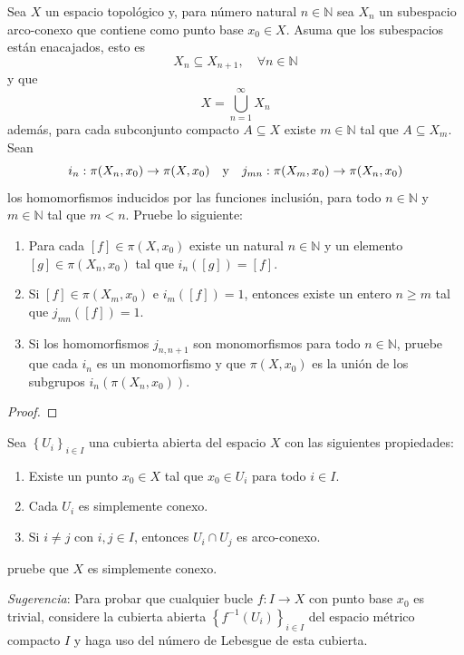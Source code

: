 \documentclass[12pt]{report}
\theoremstyle{largebreak}
\newcommand\cf[3]{\ensuremath{#1:#2\rightarrow#3}}
\begin{document}
    \begin{excer}
        Sea $X$ un espacio topológico y, para número natural $n\in\mathbb{N}$ sea $X_n$ un subespacio arco-conexo que contiene como punto base $x_0\in X$. Asuma que los subespacios están enacajados, esto es
        \begin{equation*}
            X_n\subseteq X_{ n+1},\quad\forall n\in\mathbb{N}
        \end{equation*}
        y que
        \begin{equation*}
            X=\bigcup_{ n=1}^{\infty}X_n
        \end{equation*}
        además, para cada subconjunto compacto $A\subseteq X$ existe $m\in\mathbb{N}$ tal que $A\subseteq X_m$. Sean
        \begin{equation*}
            \cf{i_n}{\pi(X_n,x_0)}{\pi(X,x_0)}\quad\textup{y}\quad \cf{j_{ mn}}{\pi(X_m,x_0)}{\pi(X_n,x_0)}
        \end{equation*}
        los homomorfismos inducidos por las funciones inclusión, para todo $n\in\mathbb{N}$ y $m\in\mathbb{N}$ tal que $m<n$. Pruebe lo siguiente:
        \begin{enumerate}
            \item Para cada $[f]\in\pi(X,x_0)$ existe un natural $n\in\mathbb{N}$ y un elemento $[g]\in\pi(X_n,x_0)$ tal que $i_n([g])=[f]$.
            \item Si $[f]\in\pi(X_m,x_0)$ e $i_m([f])=1$, entonces existe un entero $n\geq m$ tal que $j_{ mn}([f])=1$.
            \item Si los homomorfismos $j_{ n,n+1}$ son monomorfismos para todo $n\in\mathbb{N}$, pruebe que cada $i_n$ es un monomorfismo y que $\pi(X,x_0)$ es la unión de los subgrupos $i_n(\pi(X_n,x_0))$.
        \end{enumerate}
    \end{excer}

    \begin{proof}
        
    \end{proof}


    \begin{excer}
        Sea $\left\{U_i \right\}_{ i\in I}$ una cubierta abierta del espacio $X$ con las siguientes propiedades:
        \renewcommand{\theenumi}{\alph{enumi}}
        \begin{enumerate}
            \item Existe un punto $x_0\in X$ tal que $x_0\in U_i$ para todo $i\in I$.
            \item Cada $U_i$ es simplemente conexo.
            \item Si $i\neq j$ con $i,j\in I$, entonces $U_i\cap U_j$ es arco-conexo. 
        \end{enumerate}
        pruebe que $X$ es simplemente conexo.
        
        \textit{Sugerencia}: Para probar que cualquier bucle $\cf{f}{I}{X}$ con punto base $x_0$ es trivial, considere la cubierta abierta $\left\{f^{-1}(U_i) \right\}_{ i\in I}$ del espacio métrico compacto $I$ y haga uso del número de Lebesgue de esta cubierta.
    \end{excer}
\end{document}
